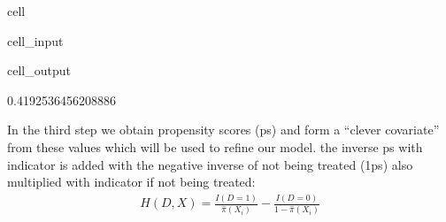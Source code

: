 \documentclass[letterpaper,10pt,english]{jupyterBook}
\begin{document}
\begin{sphinxuseclass}{cell}
\begin{sphinxVerbatimInput}
\begin{sphinxuseclass}{cell_input}
\begin{sphinxVerbatim}[commandchars=\\\{\}]
\PYG{p}{[}\PYG{p}{]}  \PYG{p}{[}\PYG{p}{]}
\end{sphinxVerbatim}

\end{sphinxuseclass}\end{sphinxVerbatimInput}
\begin{sphinxVerbatimOutput}

\begin{sphinxuseclass}{cell_output}
\begin{sphinxVerbatim}[commandchars=\\\{\}]
0.4192536456208886
\end{sphinxVerbatim}

\end{sphinxuseclass}\end{sphinxVerbatimOutput}

\end{sphinxuseclass}
\sphinxAtStartPar
In the third step we obtain propensity scores (ps) and form a “clever covariate” from these values which will be used to refine our model. the inverse ps with indicator is added with the negative inverse of not being treated (1\sphinxhyphen{}ps) also multiplied with indicator if not being treated:
\begin{equation*}
\begin{split}H(D,X) = \frac{I(D=1)}{\hat \pi (X_i)} - \frac{I(D=0)}{1 - \hat \pi (X_i)}\end{split}
\end{equation*}
\end{document}
